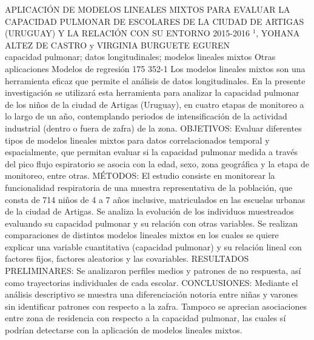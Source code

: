 \A
{APLICACIÓN DE MODELOS LINEALES MIXTOS PARA EVALUAR LA CAPACIDAD PULMONAR DE ESCOLARES DE LA CIUDAD DE ARTIGAS (URUGUAY) Y LA RELACIÓN CON SU ENTORNO 2015-2016}
{$^1$, YOHANA ALTEZ DE CASTRO y VIRGINIA BURGUETE EGUREN }
{
\\}
{capacidad pulmonar; datos longitudinales; modelos lineales mixtos} 
 {Otras aplicaciones} 
 {Modelos de regresión} 
 {175} 
 {352-1}
{Los modelos lineales mixtos son una herramienta eficaz que permite el análisis de datos longitudinales. En la presente investigación se utilizará esta herramienta para analizar la capacidad pulmonar de los niños de la ciudad de Artigas (Uruguay), en cuatro etapas de monitoreo a lo largo de un año, contemplando periodos de intensificación de la actividad industrial (dentro o fuera de zafra) de la zona. OBJETIVOS: Evaluar diferentes tipos de modelos lineales mixtos para datos correlacionados temporal y espacialmente, que permitan evaluar si la capacidad pulmonar medida a través del pico flujo espiratorio se asocia con la edad, sexo, zona geográfica y la etapa de monitoreo, entre otras. MÉTODOS: El estudio consiste en monitorear la funcionalidad respiratoria de una muestra representativa de la población, que consta de 714 niños de 4 a 7 años inclusive, matriculados en las escuelas urbanas de la ciudad de Artigas. Se analiza la evolución de los individuos muestreados evaluando su capacidad pulmonar y su relación con otras variables. Se realizan comparaciones de distintos modelos lineales mixtos en los cuales se quiere explicar una variable cuantitativa (capacidad pulmonar) y su relación lineal con factores fijos, factores aleatorios y las covariables. RESULTADOS PRELIMINARES: Se analizaron perfiles medios y patrones de no respuesta, así como trayectorias individuales de cada escolar. CONCLUSIONES: Mediante el análisis descriptivo se muestra una diferenciación notoria entre niñas y varones sin identificar patrones con respecto a la zafra. Tampoco se aprecian asociaciones entre zona de residencia con respecto a la capacidad pulmonar, las cuales sí podrían detectarse con la aplicación de modelos lineales mixtos.}
